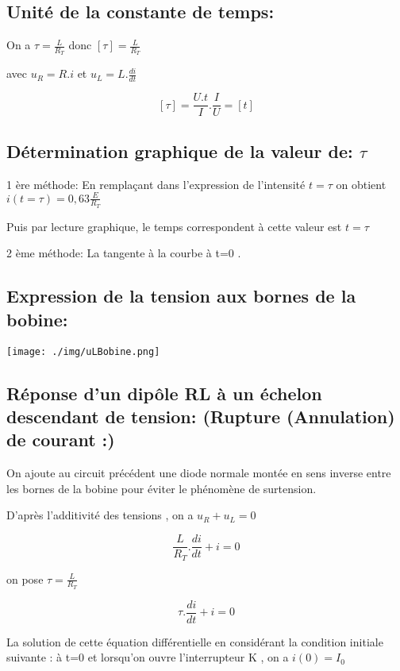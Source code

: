 \documentclass[12pt]{article}
\begin{document}
\subsection{Unité de la constante de temps: }
On a $\tau = \frac{L}{R_T}$ donc $[\tau] = \frac{L}{R_T}$

avec $u_R = R.i$ et $u_L = L.\frac{di}{dt}$

$$[\tau] = \frac{U.t}{I}.\frac{I}{U} = [t]$$

\subsection{Détermination graphique de la valeur de: $\tau$}


1 ère méthode: En remplaçant dans l'expression de l'intensité $t=\tau$ on obtient $i(t=\tau) = 0,63\frac{E}{R_T}$

Puis par lecture graphique, le temps correspondent à cette valeur est $t = \tau$

2 ème méthode: La tangente à la courbe à t=0 .


\subsection{ Expression de la tension aux bornes de la bobine:}

\begin{center}


	\texttt{[image: ./img/uLBobine.png]}
\end{center}


\subsection{Réponse d'un dipôle RL à un échelon descendant de tension:  (Rupture (Annulation) de courant :)}

On ajoute au circuit précédent une diode normale montée en sens inverse entre les bornes de la bobine pour éviter le
phénomène de surtension.

D’après l’additivité des tensions , on a $u_R + u_L = 0$

$$\frac{L}{R_T}.\frac{di}{dt} + i = 0 $$

on pose $\tau = \frac{L}{R_T}$

$$\tau.\frac{di}{dt} + i = 0 $$

La solution de cette équation différentielle en considérant la condition
initiale suivante : à t=0 et lorsqu’on ouvre l’interrupteur K , on a $i(0)=I_0$
\end{document}
